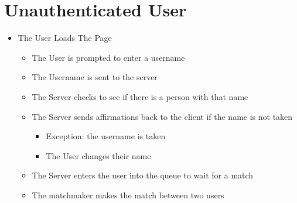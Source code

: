 \documentclass[11pt]{article}
\author{leeyman}
\date{\today}
\title{}
\begin{document}
\tableofcontents

\section{Unauthenticated User}
\label{sec:orgaf5641d}
\begin{itemize}
\item The User Loads The Page
\begin{itemize}
\item The User is prompted to enter a username
\item The Username is sent to the server
\item The Server checks to see if there is a person with that name
\item The Server sends affirmations back to the client if the name is not taken
\begin{itemize}
\item Exception: the username is taken
\item The User changes their name
\end{itemize}
\item The Server enters the user into the queue to wait for a match
\item The matchmaker makes the match between two users
\end{itemize}
\end{itemize}
\end{document}
